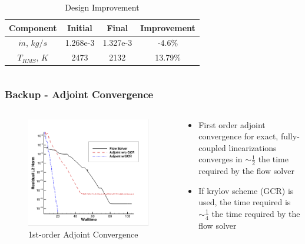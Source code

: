 \documentclass{beamer}
\begin{document}
\begin{frame}
\begin{columns}
\begin{column}{0.6\textwidth}
\begin{itemize}
\begin{table}
            \tiny
            \centering
            \begin{tabular}{c|c|c|c}
              Component & Initial & Final & Improvement\\
              \hline
              $\dot{m}$, $kg/s$ & 1.268e-3 & 1.327e-3 & -4.6\% \\
              $T_{RMS}$, $K$ & 2473        & 2132     & 13.79\%
            \end{tabular}
            \caption{Design Improvement}
            \label{tab:design-improvement}
          \end{table}
      \end{itemize}
    \end{column}
  \end{columns}
\end{frame}
\begin{frame}
  \frametitle{Backup - Adjoint Convergence}
  \begin{columns}
    \begin{column}{0.5\textwidth}
      \begin{figure}[h]
        \centering
        \includegraphics[width=\textwidth]{figures/adj-comp.png}
        \caption{1st-order Adjoint Convergence}
        \label{fig:adj-comp}
      \end{figure}
    \end{column}
    \begin{column}{0.5\textwidth}
      \begin{itemize}
        \item First order adjoint convergence for exact, fully-coupled
          linearizations converges in $\sim \frac{1}{2}$ the time required by
          the flow solver
        \item If krylov scheme (GCR) is used, the time required is 
          $\sim \frac{1}{4}$ the time required by the flow solver
      \end{itemize}
    \end{column}
  \end{columns}
\end{frame}
\end{document}
